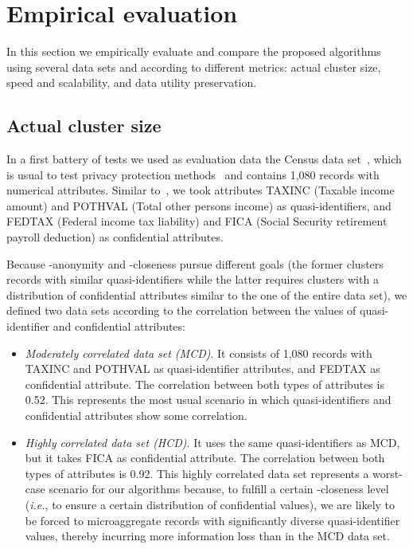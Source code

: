 \documentclass[10pt,journal,compsoc]{IEEEtran}
\theoremstyle{definition}
\theoremstyle{plain}
\begin{document}
\section{Empirical evaluation}
\label{sec:empirical}

In this section we empirically evaluate and compare
the proposed algorithms using several data sets and according
to different metrics: actual cluster size, 
speed and scalability, and data utility preservation. 

\subsection{Actual cluster size}
\label{sec:behavior}

In a first battery of tests we used as evaluation data 
the Census data set~\cite{Brand}, which is usual to test 
privacy protection methods~\cite{Yanc02,Lasz05,Domingo10}
and contains 1,080 records with numerical attributes. 
Similar to~\cite{Domingo10}, we took attributes
TAXINC (Taxable income amount) and POTHVAL (Total other persons income)
as quasi-identifiers, and FEDTAX (Federal income tax liability)
and FICA (Social Security retirement payroll deduction)
as confidential attributes. 

Because -anonymity and -closeness pursue different goals
(the former clusters records with similar quasi-identifiers while 
the latter requires clusters with a distribution of 
confidential attributes similar to the one of the entire data set),
we defined two data sets according to the
correlation between the values of quasi-identifier and confidential attributes:

\begin{itemize}
\item {\em Moderately correlated data set (MCD)}. It consists of 
1,080 records with TAXINC and POTHVAL 
as quasi-identifier attributes, and FEDTAX as confidential attribute. The correlation 
between both types of attributes is 0.52. This represents the most 
usual scenario in which quasi-identifiers and confidential attributes 
show some correlation. 
\item {\em Highly correlated data set (HCD)}. 
It uses the same quasi-identifiers as MCD,
but it takes FICA as confidential attribute. The correlation between
both types of attributes is 0.92. This highly correlated data set represents
a worst-case scenario for our algorithms because, to fulfill a certain 
-closeness level 
({\em i.e.}, to ensure a certain distribution of confidential values), 
we are likely to be forced to microaggregate records
with significantly diverse quasi-identifier values, thereby 
incurring more information loss than in the MCD data set.
\end{itemize}
\end{document}
